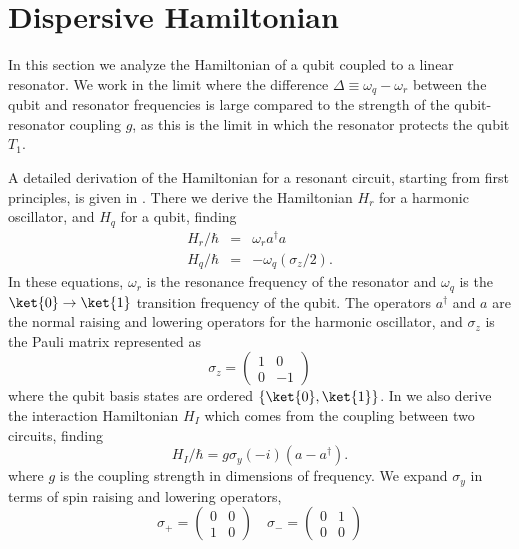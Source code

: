 \section{Dispersive Hamiltonian}

In this section we analyze the Hamiltonian of a qubit coupled to a linear resonator.
We work in the limit where the difference $\Delta \equiv \omega_q - \omega_r$ between the qubit and resonator frequencies is large compared to the strength of the qubit-resonator coupling $g$, as this is the limit in which the resonator protects the qubit $T_1$.

A detailed derivation of the Hamiltonian for a resonant circuit, starting from first principles, is given in \citeinternaltype {}.
There we derive the Hamiltonian $H_r$ for a harmonic oscillator, and $H_q$ for a qubit, finding \begin{eqnarray}
H_r/\hbar &=& \omega_r a^{\dagger}a \\
H_q/\hbar &=& - \omega_q (\sigma_z/2) . \end{eqnarray}
In these equations, $\omega_r$ is the resonance frequency of the resonator and $\omega_q$ is the $\ket{0}\rightarrow \ket{1}$ transition frequency of the qubit.
The operators $a^{\dagger}$ and $a$ are the normal raising and lowering operators for the harmonic oscillator, and $\sigma_z$ is the Pauli matrix represented as \begin{equation}
\sigma_z = \left( \begin{array}{cc} 1 & 0 \\ 0 & -1 \end{array} \right) \end{equation}
where the qubit basis states are ordered $\left\{ \ket{0}, \ket{1} \right\}$.
In \citeinternaltype {} we also derive the interaction Hamiltonian $H_I$ which comes from the coupling between two circuits, finding \begin{equation}
H_I/\hbar = g \sigma_y (-i)(a - a^{\dagger}) . \end{equation}
where $g$ is the coupling strength in dimensions of frequency.
We expand $\sigma_y$ in terms of spin raising and lowering operators, \begin{equation}
\sigma_+ = \left( \begin{array}{cc} 0 & 0 \\ 1 & 0 \end{array} \right) \quad
\sigma_- = \left( \begin{array}{cc} 0 & 1 \\ 0 & 0 \end{array} \right) \end{equation}
